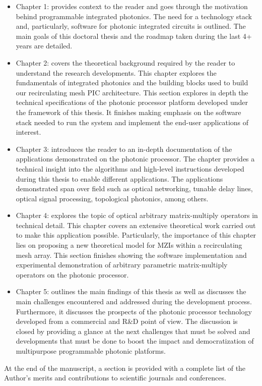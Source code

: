 \begin{itemize}
	\item Chapter 1:  provides context to the reader and goes through the motivation behind programmable integrated photonics.
	      The need for a technology stack and, particularly, software for photonic integrated circuits is outlined.
	      The main goals of this doctoral thesis and the roadmap taken during the last 4+ years are detailed.
	\item Chapter 2:  covers the theoretical background required by the reader to understand the research developments.
	      This chapter explores the fundamentals of integrated photonics and the building blocks used to build our recirculating mesh PIC architecture.
	      This section explores in depth the technical specifications of the photonic processor platform developed under the framework of this thesis.
	      It finishes making emphasis on the software stack needed to run the system and implement the end-user applications of interest.
	\item Chapter 3:  introduces the reader to an in-depth documentation of the applications demonstrated on the photonic processor.
	      The chapter provides a technical insight into the algorithms and high-level instructions developed during this thesis to enable different applications.
	      The applications demonstrated span over field such as optical networking, tunable delay lines, optical signal processing, topological photonics, among others.
	\item Chapter 4:  explores the topic of optical arbitrary matrix-multiply operators in technical detail.
	      This chapter covers an extensive theoretical work carried out to make this application possible.
	      Particularly, the importance of this chapter lies on proposing a new theoretical model for MZIs within a recirculating mesh array.
	      This section finishes showing the software implementation and experimental demonstration of arbitrary parametric matrix-multiply operators on the photonic processor.
	\item Chapter 5:  outlines the main findings of this thesis as well as discusses the main challenges encountered and addressed during the development process.
	      Furthermore, it discusses the prospects of the photonic processor technology developed from a commercial and R\&D point of view.
	      The discussion is closed by providing a glance at the next challenges that must be solved and developments that must be done to boost the impact and democratization of multipurpose programmable photonic platforms.
\end{itemize}

At the end of the manuscript, a section is provided with a complete list of the Author’s merits and contributions to scientific journals and conferences.

